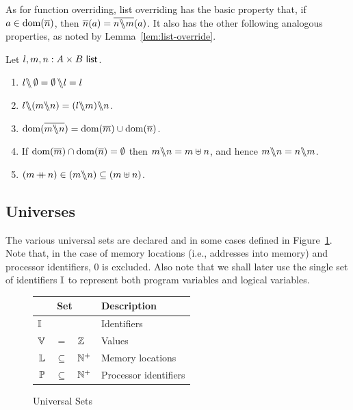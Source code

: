 \documentclass[11pt]{report}         %
\begin{document}
As for function overriding, list overriding has the basic property that, if $a \in \operatorname{\mathrm{dom}}(\overline{n})$, then $\overline{n}(a) = \overline{n \backslash\!\!\backslash m}(a)$. It also has the other following analogous properties, as noted by Lemma~\ref{lem:list-override}. 
\begin{proposition}
    \label{lem:list-override}
    Let $l,m,n : A \times B~\mathsf{list}$. 
    \begin{enumerate}
        \item $l \backslash\!\!\backslash \operatorname{\emptyset} = \operatorname{\emptyset} \backslash\!\!\backslash l = l$
        \item $l \override (m \override n) = (l \override m) \override n$. 
        \item $\operatorname{\mathrm{dom}}(\overline{m \backslash\!\!\backslash n}) = \operatorname{\mathrm{dom}}(\overline{m}) \cup \operatorname{\mathrm{dom}}(\overline{n})$. 
        \item If $\operatorname{\mathrm{dom}}(\overline{m}) \cap \operatorname{\mathrm{dom}}(\overline{n}) = \operatorname{\emptyset}$ then $m \backslash\!\!\backslash n = m \uplus n$, and hence $m \backslash\!\!\backslash n = n \backslash\!\!\backslash m$. 
        \item $(m \operatorname{+\!\!\!+} n) \in (m \backslash\!\!\backslash n) \subseteq (m \uplus n)$.
    \end{enumerate}
\end{proposition}


\subsection{Universes}
\label{sec:universes} 

The various universal sets are declared and in some cases defined in Figure~\ref{fig:universes}. Note that, in the case of memory locations (i.e., addresses into memory) and processor identifiers, 0 is excluded. Also note that we shall later use the single set of identifiers $\mathbb{I}$ to represent both program variables and logical variables.

\begin{figure}[ht]
  \centering
  \begin{tabular}{rcl|l}
    \multicolumn{3}{c}{Set} & Description \\ \hline
    \multicolumn{3}{l|}{$\mathbb{I}$} & Identifiers \\
    $\mathbb{V}$ & $=$ &  $\mathbb{Z}$ & Values \\
    $\mathbb{L}$ & $\subseteq$  &  $\mathbb{N}^+$ & Memory locations \\
    $\mathbb{P}$ &$\subseteq$ &  $\mathbb{N}^+$ & Processor identifiers
  \end{tabular}
  \caption{\label{fig:universes}Universal Sets}
\end{figure}
\end{document}
